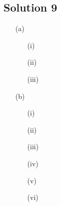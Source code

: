 \subsection*{Solution 9}

\begin{itemize}
\item[(a)]

\begin{itemize}
\item[(i)]
\todo
\item[(ii)]
\todo
\item[(iii)]
\todo
\end{itemize}

\item[(b)]

\begin{itemize}
\item[(i)]
\todo
\item[(ii)]
\todo
\item[(iii)]
\todo
\item[(iv)]
\todo
\item[(v)]
\todo
\item[(vi)]
\todo
\end{itemize}

\end{itemize}

